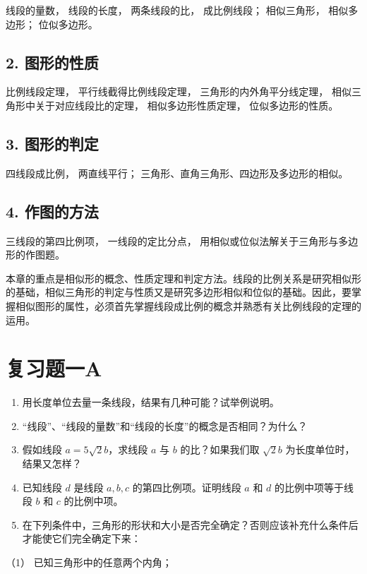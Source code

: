 线段的量数， 线段的长度， 两条线段的比， 成比例线段； 相似三角形，
相似多边形； 位似多边形。

\subsection{2. 图形的性质}

比例线段定理， 平行线截得比例线段定理， 三角形的内外角平分线定理，
相似三角形中关于对应线段比的定理， 相似多边形性质定理，
位似多边形的性质。

\subsection{3. 图形的判定}

四线段成比例， 两直线平行； 三角形、直角三角形、四边形及多边形的相似。

\subsection{4. 作图的方法}

三线段的第四比例项， 一线段的定比分点，
用相似或位似法解关于三角形与多边形的作图题。

本章的重点是相似形的概念、性质定理和判定方法。线段的比例关系是研究相似形的基础，相似三角形的判定与性质又是研究多边形相似和位似的基础。因此，要掌握相似图形的属性，必须首先掌握线段成比例的概念并熟悉有关比例线段的定理的运用。

\section{复习题一A}

\begin{enumerate}
\item
  用长度单位去量一条线段，结果有几种可能？试举例说明。
\item
  ``线段''、``线段的量数''和``线段的长度''的概念是否相同？为什么？
\item
  假如线段 \(a = 5\sqrt{2} b\)，求线段 \(a\) 与 \(b\) 的比？如果我们取
  \(\sqrt{2} b\) 为长度单位时，结果又怎样？
\item
  已知线段 \(d\) 是线段 \(a, b, c\) 的第四比例项。证明线段 \(a\) 和
  \(d\) 的比例中项等于线段 \(b\) 和 \(c\) 的比例中项。
\item
  在下列条件中，三角形的形状和大小是否完全确定？否则应该补充什么条件后才能使它们完全确定下来：
\end{enumerate}

（1） 已知三角形中的任意两个内角；

